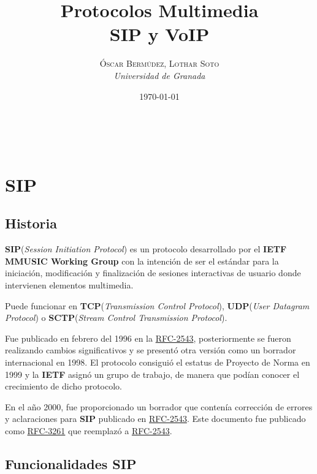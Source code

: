 \documentclass[a4paper, 11pt]{article} %
\title{\textbf{Protocolos Multimedia}\\ %
\vspace{20 pt}
SIP y VoIP} %
\author{\textsc{Óscar Bermúdez, Lothar Soto} %
\\{\textit{Universidad de Granada}}} %
\date{\today} %
\makeatletter
\newcommand{\RFC}[1]{\href{https://www.ietf.org/rfc/rfc#1.txt}{RFC-#1}}
\renewcommand{\maketitle}{ %
\begin{center} %
{\Huge\@title} %
\end{center}

\vspace{20pt} %

\begin{flushright} %
{\large\@author} %
\\\@date %

\vspace{40pt} %
\end{flushright}
}
\makeatother
\begin{document}
\maketitle %

{\parskip=2pt
\tableofcontents
}
\pagebreak

\section{SIP}
	\subsection{Historia}
	\textbf{SIP}(\textit{Session Initiation Protocol}) es un protocolo desarrollado por el \textbf{IETF MMUSIC Working Group} con la intención de ser el estándar para la iniciación, modificación y finalización de sesiones interactivas de usuario donde intervienen elementos multimedia.
	
	Puede funcionar en \textbf{TCP}(\textit{Transmission Control Protocol}), \textbf{UDP}(\textit{User Datagram Protocol}) o \textbf{SCTP}(\textit{Stream Control Transmission Protocol}).
	
	Fue publicado en febrero del 1996 en la \RFC{2543}, posteriormente se fueron realizando cambios significativos y se presentó otra versión como un borrador internacional en 1998. El protocolo consiguió el estatus de Proyecto de Norma en 1999 y la \textbf{IETF} asignó un grupo de trabajo, de manera que podían conocer el crecimiento de dicho protocolo.
	
	En el año 2000, fue proporcionado un borrador que contenía corrección de errores y aclaraciones para \textbf{SIP} publicado en \RFC{2543}. Este documento fue publicado como \RFC{3261} que reemplazó a \RFC{2543}.
	
	\subsection{Funcionalidades SIP}
\end{document}
